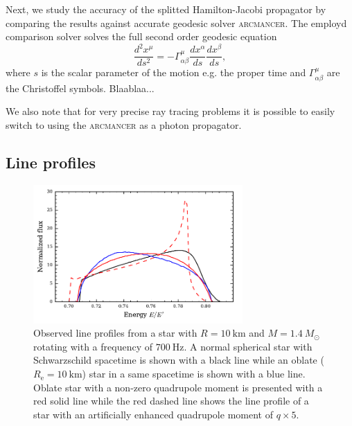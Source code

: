 \documentclass[iop, usenatbib]{emulateapj}
\newcommand{\be}{\begin{equation}}
\newcommand{\ee}{\end{equation}}
\newcommand{\sch}{Schwarzschild }
\newcommand{\Msun}{\ensuremath{M_{\odot}}}
\begin{document}
Next, we study the accuracy of the splitted Hamilton-Jacobi propagator by comparing the results against accurate geodesic solver \textsc{arcmancer}.
The employd comparison solver solves the full second order geodesic equation
\be
\frac{d^2 x^{\mu}}{ds^2} = -\Gamma^{\mu}_{\alpha \beta} \frac{dx^{\alpha}}{ds} \frac{dx^{\beta}}{ds},
\ee
where $s$ is the scalar parameter of the motion e.g. the proper time and $\Gamma^{\mu}_{\alpha \beta}$ are the Christoffel symbols.
Blaablaa...

We also note that for very precise ray tracing problems it is possible to easily switch to using the \textsc{arcmancer} as a photon propagator.





\subsection{Line profiles}

\begin{figure}
\includegraphics[width=8cm]{figs/fig9a.pdf}
\caption{\label{fig:line_profiles}
  Observed line profiles from a star with $R=10~\mathrm{km}$ and $M=1.4~\Msun$ rotating with a frequency of $700~\mathrm{Hz}$.
  A normal spherical star with \sch spacetime is shown with a black line while an oblate ($R_{\mathrm{e}}=10~\mathrm{km}$) star in a same spacetime is shown with a blue line.
  Oblate star with a non-zero quadrupole moment is presented with a red solid line while the red dashed line shows the line profile of a star with an artificially enhanced quadrupole moment of $q \times 5$.
  }
\end{figure}
\end{document}
